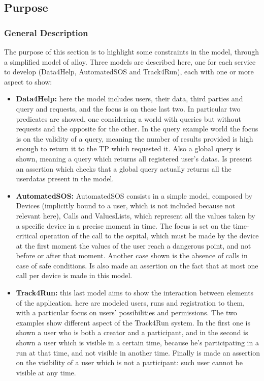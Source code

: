 \color{black}
{\color{secblue}\subsection{Purpose}}

{\color{secblue}\subsubsection{General Description}}
The purpose of this section is to highlight some constraints in the model, through a simplified model of alloy.
Three models are described here, one for each service to develop (Data4Help, AutomatedSOS and Track4Run), each with one or more aspect to show:
\begin{itemize}
\item \textbf{Data4Help:} here the model includes users, their data, third parties and query and requests, and the focus is on these last two. In particular two predicates are showed, one considering a world with queries but without requests and the opposite for the other. In the query example world the focus is on the validity of a query, meaning the number of results provided is high enough to return it to the TP which requested it. Also a global query is shown, meaning a query which returns all registered user's datas. Is present an assertion which checks that a global query actually returns all the userdatas present in the model.
\item \textbf{AutomatedSOS:} AutomatedSOS consists in a simple model, composed by Devices (implicitly bound to a user, which is not included because not relevant here), Calls and ValuesLists, which represent all the values taken by a specific device in a precise moment in time. The focus is set on the time-critical operation of the call to the ospital, which must be made by the device at the first moment the values of the user reach a dangerous point, and not before or after that moment. Another case shown is the absence of calls in case of safe conditions. Is also made an assertion on the fact that at most one call per device is made in this model.
\item \textbf{Track4Run:} this last model aims to show the interaction between elements of the application. here are modeled users, runs and registration to them, with a particular focus on users' possibilities and permissions. The two examples show different aspect of the Track4Run system. In the first one is shown a user who is both a creator and a participant, and in the second is shown a user which is visible in a certain time, because he's participating in a run at that time, and not visible in another time.
Finally is made an assertion on the visibility of a user which is not a participant: such user cannot be visible at any time.
\end{itemize}

